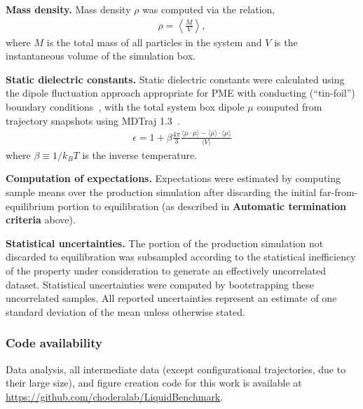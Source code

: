 \documentclass[aps,pre,twocolumn,nofootinbib,superscriptaddress,linenumbers]{revtex4-1}
\begin{document}
{\bf Mass density.}
Mass density $\rho$ was computed via the relation,
\begin{eqnarray}
\rho = \left\langle \frac{M}{V} \right\rangle \label{equation:mass-density} ,
 \end{eqnarray}
where $M$ is the total mass of all particles in the system and $V$ is the instantaneous volume of the simulation box.

{\bf Static dielectric constants.}
Static dielectric constants were calculated using the dipole fluctuation approach appropriate for PME with conducting (``tin-foil'') boundary conditions~\cite{horn2004, neumann1983dipole}, with the total system box dipole $\mu$ computed from trajectory snapshots using MDTraj 1.3~\cite{mcgibbon2014mdtraj}.
\begin{eqnarray}
\epsilon = 1 + \beta \frac{4\pi}{3} \frac{\langle \mu \cdot \mu \rangle - \langle \mu \rangle \cdot \langle \mu \rangle}{\langle V \rangle} \label{equation:dielectric_calculation}
\end{eqnarray}
where $\beta \equiv 1 / k_B T$ is the inverse temperature.

{\bf Computation of expectations.}
Expectations were estimated by computing sample means over the production simulation after discarding the initial far-from-equilibrium portion to equilibration (as described in {\bf Automatic termination criteria} above).

{\bf Statistical uncertainties.}
The portion of the production simulation not discarded to equilibration was subsampled according to the statistical inefficiency of the property under consideration to generate an effectively uncorrelated dataset.
Statistical uncertainties were computed by bootstrapping these uncorrelated samples.
All reported uncertainties represent an estimate of one standard deviation of the mean unless otherwise stated.

\subsubsection{Code availability}

Data analysis, all intermediate data (except configurational trajectories, due to their large size), and figure creation code for this work is available at \url{https://github.com/choderalab/LiquidBenchmark}.  
\end{document}
